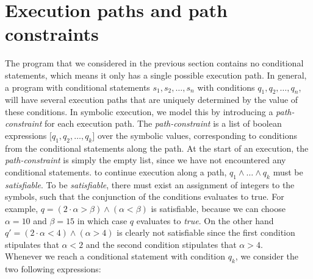 \section{Execution paths and path constraints}
		The program that we considered in the previous section contains no conditional statements, which means it only has a single possible execution path. In general, a program with conditional statements $s_1, s_2, \ldots, s_n$ with conditions $q_1, q_2, \ldots, q_n$, will have several execution paths that are uniquely determined by the value of these conditions. In symbolic execution, we model this by introducing a \emph{path-constraint} for each execution path. The \emph{path-constraint} is a list of boolean expressions $\lbrack q_1, q_2, \ldots, q_k \rbrack$ over the symbolic values, corresponding to conditions from the conditional statements along the path. At the start of an execution, the \emph{path-constraint} is simply the empty list, since we have not encountered any conditional statements. to continue execution along a path, $q_1 \land \ldots \land q_k$ must be \emph{satisfiable}. To be \emph{satisfiable}, there must exist an assignment of integers to the symbols, such that the conjunction of the conditions evaluates to true. For example, $q = (2\cdot \alpha > \beta) \land (\alpha < \beta)$ is satisfiable, because we can choose $\alpha = 10$ and $\beta = 15$ in which case $q$ evaluates to \emph{true}. On the other hand $q' = (2 \cdot \alpha < 4) \land (\alpha > 4)$ is clearly not satisfiable since the first condition stipulates that $\alpha < 2$ and the second condition stipulates that $\alpha > 4$.
		\\
	
		\noindent Whenever we reach a conditional statement with condition $q_k$, we consider the two following expressions:
	
